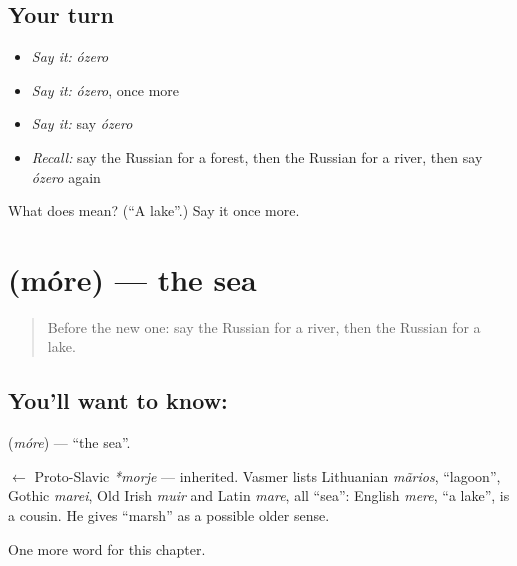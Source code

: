 \subsection*{Your turn}
\begin{itemize}
\raggedright
  \item \emph{Say it:} \emph{ózero}
  \item \emph{Say it:} \emph{ózero}, once more
  \item \emph{Say it:} say \emph{ózero}
  \item \emph{Recall:} say the Russian for a forest, then the Russian for a river, then say \emph{ózero} again
\end{itemize}

\begin{tcolorbox}[breakable,colback=teal!4,colframe=teal!35!black,title={Before you move on}]
What does  mean? (\textquotedblleft{}A lake\textquotedblright{}.) Say it once more.
\end{tcolorbox}
\section[\texorpdfstring{\ru{море} (móre)}{море (móre)}]{ (móre) — the sea}

\label{lesson:RU-C56-sea}



\begin{quote}
Before the new one: say the Russian for a river, then the Russian for a lake.
\end{quote}

\subsection*{You'll want to know: }
\textbf{} (\emph{móre}) — \textquotedblleft{}the sea\textquotedblright{}.

\begin{cousinweb}
\textbf{} $\leftarrow$ Proto-Slavic \emph{*morje} — inherited. Vasmer lists Lithuanian \emph{mãrios}, \textquotedblleft{}lagoon\textquotedblright{}, Gothic \emph{marei}, Old Irish \emph{muir} and Latin \emph{mare}, all \textquotedblleft{}sea\textquotedblright{}: English \emph{mere}, \textquotedblleft{}a lake\textquotedblright{}, is a cousin. He gives \textquotedblleft{}marsh\textquotedblright{} as a possible older sense.
\end{cousinweb}

\begin{grammarlens}[title={What you've built}]
One more word for this chapter.
\end{grammarlens}

